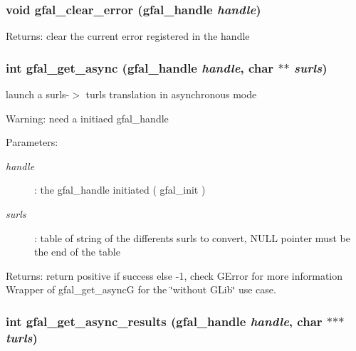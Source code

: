 \subsubsection{\setlength{\rightskip}{0pt plus 5cm}void gfal\_\-clear\_\-error (gfal\_\-handle {\em handle})}\label{gfal__common__interface_8h_4ca376cf47166fabd46a45fccb863ebe}


\begin{Desc}
\item[Returns:]clear the current error registered in the handle \end{Desc}
\subsubsection{\setlength{\rightskip}{0pt plus 5cm}int gfal\_\-get\_\-async (gfal\_\-handle {\em handle}, char $\ast$$\ast$ {\em surls})}\label{gfal__common__interface_8h_68ef05f37b4971c8306b1cc6ee529647}


launch a surls-$>$ turls translation in asynchronous mode 

\begin{Desc}
\item[Warning:]need a initiaed gfal\_\-handle \end{Desc}
\begin{Desc}
\item[Parameters:]
\begin{description}
\item[{\em handle}]: the gfal\_\-handle initiated ( gfal\_\-init ) \item[{\em surls}]: table of string of the differents surls to convert, NULL pointer must be the end of the table \end{description}
\end{Desc}
\begin{Desc}
\item[Returns:]return positive if success else -1, check GError for more information Wrapper of gfal\_\-get\_\-async\-G for the \char`\"{}without GLib\char`\"{} use case. \end{Desc}
\subsubsection{\setlength{\rightskip}{0pt plus 5cm}int gfal\_\-get\_\-async\_\-results (gfal\_\-handle {\em handle}, char $\ast$$\ast$$\ast$ {\em turls})}\label{gfal__common__interface_8h_0c654545b837b8e1928842ee762ce5e9}


